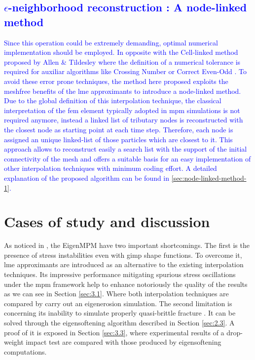 \message{ !name(2020_EFM_MPM_Eigensoftening.tex)}\documentclass[preprint,12pt,a4paper]{elsarticle}
\newcommand{\MMP}[1]{
  \textcolor{blue}{{#1}}
}
\begin{document}
\MMP{
\subsection{$\epsilon$-neighborhood reconstruction : A node-linked method}
\label{sec:epsil-neighb-reconst}
Since this operation could be extremely demanding, optimal
numerical implementation should be employed. In opposite with the Cell-linked
method proposed by Allen \& Tildesley \cite{Allen_et_al_1989} where
the definition of a numerical tolerance is required for auxiliar
algorithms like Crossing Number \cite{Shimrat_1962} or Correct
Even-Odd \cite{Galetzka_et_al_2017}. To avoid these error prone
techniques, the method here proposed exploits the meshfree benefits of
the \acrshort{lme} approximants to introduce a node-linked method. Due
to the global definition of this interpolation technique, the classical
interpretation of the \acrshort{fem} element typically adopted in
\acrshort{mpm} simulations is not required anymore, instead a linked
list of tributary nodes is reconstructed with the closest node as
starting point at each time step. Therefore, each node is assigned an
unique linked-list of those particles which are closest to it. This
approach allows to reconstruct easily a search list with the support
of the initial connectivity of the mesh and offers a suitable basis
for an easy implementation of other interpolation techniques with
minimum coding effort. A detailed explanation of the proposed
algorithm can be found in \ref{sec:node-linked-method-1}.
}
\section{Cases of study and discussion}
\label{sec:3}

As noticed in \cite{Zhang_EE_2020}, the EigenMPM have two important
shortcomings. The first is the presence of stress instabilities even
with \acrshort{gimp} shape functions. To overcome it, \acrshort{lme}
approximants are introduced as an
alternative to the existing interpolation techniques. Its
impressive performance mitigating spurious stress oscillations
\cite{Wobbes2020} under the \acrshort{mpm} framework help to enhance
notoriously the quality of the results as we can see in Section
\ref{sec:3.1}. Where both interpolation techniques
are compared by carry out an eigenerosion simulation. The second
limitation is concerning its inability to simulate properly quasi-brittle
fracture \cite{Navas_2018_ES}. It can be solved through the
eigensoftening algorithm described in Section \ref{sec:2.3}. A proof
of it is exposed in Section \ref{sec:3.3}, where experimental results
of a drop-weight impact test are compared with those produced by
eigensoftening computations.
\end{document}
